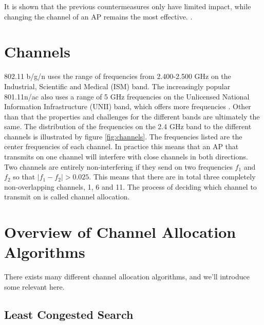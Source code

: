 	It is shown that the previous countermeasures only have limited
	impact, while changing the channel of an AP remains the most effective.
	\cite{impactRF}. 
	\section{Channels} 
	802.11 b/g/n uses the range of frequencies from 2.400-2.500 GHz on the Industrial,
	Scientific and Medical (ISM) band.
	The increasingly popular 801.11n/ac also uses a range of 5 GHz frequencies on the Unlicensed
	National Information Infrastructure (UNII) band, which offers more frequencies \cite{5ghz}.
	Other than that the properties and challenges for the different bands are ultimately the same.
	The distribution of the frequencies on the 2.4 GHz band to the different channels is illustrated by figure \ref{fig:channels}. The frequencies listed are the center frequencies of each channel. In practice this means that an AP that transmits on one channel will interfere with close channels in both directions. Two channels are entirely non-interfering if they send on two frequencies  $f_{1}$ and $f_{2}$ so that $|f_{1} - f_{2}| > 0.025$. This means that there are in total three completely non-overlapping channels, 1, 6 and 11. The process of deciding which channel to transmit on is called channel allocation. 
	\section{Overview of Channel Allocation Algorithms}
	There exists many different channel allocation algorithms, and we'll introduce some relevant
	here. 

	\subsection{Least Congested Search}




